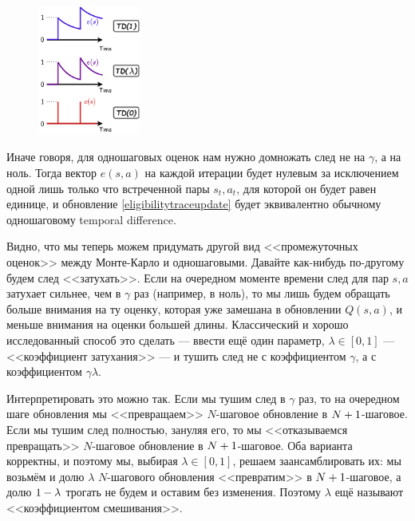 \begin{figure}
\centering
\includegraphics[width=0.3\textwidth]{Images/Traces.png}
\vspace{-0.5cm}
\end{figure}

Иначе говоря, для одношаговых оценок нам нужно домножать след не на $\gamma$, а на ноль. Тогда вектор $e(s, a)$ на каждой итерации будет нулевым за исключением одной лишь только что встреченной пары $s_t, a_t$, для которой он будет равен единице, и обновление \ref{eligibilitytraceupdate} будет эквивалентно обычному одношаговому temporal difference.

Видно, что мы теперь можем придумать другой вид <<промежуточных оценок>> между Монте-Карло и одношаговыми. Давайте как-нибудь по-другому будем след <<затухать>>. Если на очередном моменте времени след для пар $s, a$ затухает сильнее, чем в $\gamma$ раз (например, в ноль), то мы лишь будем обращать больше внимания на ту оценку, которая уже замешана в обновлении $Q(s, a)$, и меньше внимания на оценки большей длины. Классический и хорошо исследованный способ это сделать --- ввести ещё один параметр, $\lambda \in [0, 1]$ --- <<коэффициент затухания>> --- и тушить след не с коэффициентом $\gamma$, а с коэффициентом $\gamma \lambda$.

Интерпретировать это можно так. Если мы тушим след в $\gamma$ раз, то на очередном шаге обновления мы <<превращаем>> $N$-шаговое обновление в $N \HM+ 1$-шаговое. Если мы тушим след полностью, зануляя его, то мы <<отказываемся превращать>> $N$-шаговое обновление в $N \HM+ 1$-шаговое. Оба варианта корректны, и поэтому мы, выбирая $\lambda \in [0, 1]$, решаем заансамблировать их: мы возьмём и долю $\lambda$ $N$-шагового обновления <<превратим>> в $N \HM+ 1$-шаговое, а долю $1 \HM- \lambda$ трогать не будем и оставим без изменения. Поэтому $\lambda$ ещё называют <<коэффициентом смешивания>>.

